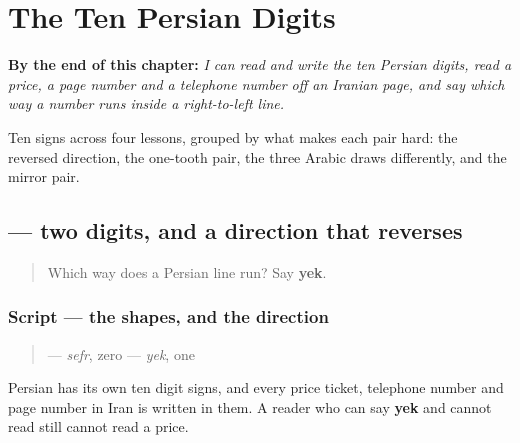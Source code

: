 
\chapter{The Ten Persian Digits}
\label{ch:fa-digits}

\begin{chapteropening}
\textbf{By the end of this chapter:} \emph{I can read and write the ten Persian digits, read a price, a page number and a telephone number off an Iranian page, and say which way a number runs inside a right-to-left line.}

Ten signs across four lessons, grouped by what makes each pair hard: the reversed direction, the one-tooth pair, the three Arabic draws differently, and the mirror pair.
\end{chapteropening}

\section[\texorpdfstring{\fa{۰} \fa{۱} (sefr yek)}{۰ ۱ (sefr yek)}]{  — two digits, and a direction that reverses}

\label{lesson:FA-W19-digits-zero-one}



\begin{quote}
Which way does a Persian line run? Say \textbf{yek}.
\end{quote}

\subsection*{Script — the shapes, and the direction}

\begin{quote}
\textbf{} — \emph{sefr}, zero  \textbf{} — \emph{yek}, one
\end{quote}

Persian has its own ten digit signs, and every price ticket, telephone number and page number in Iran is written in them. A reader who can say \textbf{yek} and cannot read \textbf{} still cannot read a price.

